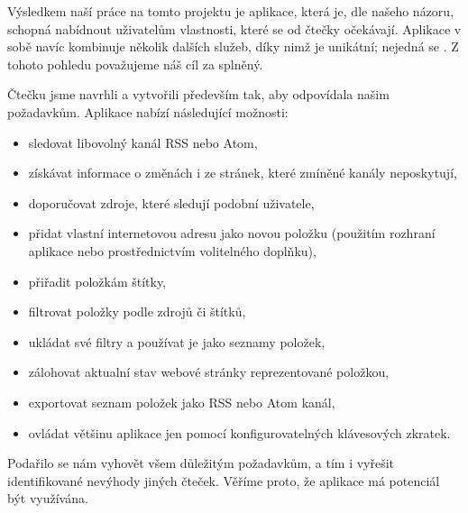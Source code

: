 
Výsledkem naší práce na tomto projektu je aplikace, která je, dle našeho názoru, schopná nabídnout uživatelům vlastnosti, které se od čtečky očekávají.
Aplikace v sobě navíc kombinuje několik dalších služeb, díky nimž je unikátní; nejedná se .
Z tohoto pohledu považujeme náš cíl za splněný.

Čtečku jsme navrhli a vytvořili především tak, aby odpovídala našim požadavkům.
Aplikace nabízí následující možnosti:
\begin{itemize}
	\item sledovat libovolný kanál RSS nebo Atom,
	\item získávat informace o změnách i ze stránek, které zmíněné kanály neposkytují,
	\item doporučovat zdroje, které sledují podobní uživatele,
	\item přidat vlastní internetovou adresu jako novou položku (použitím rozhraní aplikace nebo prostřednictvím volitelného doplňku),
	\item přiřadit položkám štítky,
	\item filtrovat položky podle zdrojů či štítků,
	\item ukládat své filtry a používat je jako seznamy položek,
	\item zálohovat aktualní stav webové stránky reprezentované položkou,
	\item exportovat seznam položek jako RSS nebo Atom kanál,
	\item ovládat většinu aplikace jen pomocí konfigurovatelných klávesových zkratek.
\end{itemize}

Podařilo se nám vyhovět všem důležitým požadavkům, a tím i vyřešit identifikované nevýhody jiných čteček.
Věříme proto, že aplikace má potenciál být využívána.
